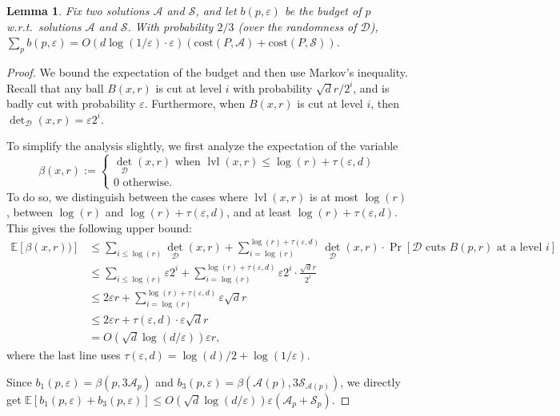 \documentclass[11pt]{article}
\newtheorem{lemma}[theorem]{Lemma}
\newcommand{\eps}{\varepsilon}
\newcommand{\cost}{\mathrm{cost}}
\newcommand{\E}{\mathbb{E}}
\newcommand{\calD}{\mathcal {D}}
\newcommand{\calS}{\mathcal {S}}
\newcommand{\calL}{\mathcal{A}}
\newcommand{\badcut}{\eps}
\newcommand{\offset}{\tau(\eps, d)}
\DeclareMathOperator{\deto}{det}
\DeclareMathOperator{\level}{lvl}
\newcommand{\david}[1]{\textcolor{orange}{#1}}
\begin{document}
\begin{lemma}\label{lem:budgetBoundedKmed}
Fix two solutions $\calL$ and $\calS$, and let $b(p, \eps)$ be the budget of $p$ w.r.t.\ solutions $\calL$ and $\calS$. With probability  $2/3$ (over the randomness of $\calD$),   $\sum_p b(p, \eps) = O(d \log(1/\eps) \cdot \eps) (\cost(P, \calL) + \cost(P, \calS))$.
\end{lemma}
\begin{proof}
 We bound the expectation of the budget and then use Markov's inequality. Recall that any ball $B(x, r)$ is cut at level $i$ with probability $\sqrt{d} r / 2^i$, and is  badly cut with probability $\badcut$. Furthermore, when $B(x, r)$  is cut at level $i$, then $\deto_\calD(x, r) = \eps 2^{i}$. 
 
 To simplify the analysis slightly, we first analyze the expectation of the variable 
\[\beta(x, r) := \begin{cases}\deto_\calD(x, r) \text{ when } \level(x, r) \leq \log(r) + \offset\\
 0 \text{ otherwise.}\end{cases}\]
 To do so, we distinguish between the cases where $\level(x, r)$ is at most $\log(r)$, between $\log(r)$ and $\log(r) + \offset$, and at least $\log(r) + \offset$. This gives the following upper bound:
 \begin{align*}
     \E[\beta(x, r))]
     &\leq \sum_{i \leq \log(r)} \deto_\calD(x, r) + \sum_{i = \log(r)}^{\log(r) + \offset} \deto_\calD(x, r) \cdot \Pr[\calD \text{ cuts } B(p,r) \text{ at a level } i]\\
     &\leq \sum_{i \leq \log(r)} \eps 2^{i} + \sum_{i = \log(r)}^{\log(r) + \offset}\eps 2^{i} \cdot \frac{\sqrt{d} r}{2^i}\\%
     &\leq 2 \eps r + \sum_{i = \log(r)}^{\log(r) + \offset} \eps \sqrt{d} r \\%
     &\leq 2\eps r + \offset \cdot \eps \sqrt{d} r\\%
     &= O(\sqrt{d}\log(d/\eps)) \eps r,
 \end{align*}
 where the last line uses $\offset =\log(d)/2 + \log(1/\badcut)$.


Since $b_1(p, \eps) = \beta(p, 3\calL_p)$ and $b_3(p, \eps) = \beta(\calL(p), 3\calS_{\calL(p)})$, we directly get $\E[b_1(p, \eps) + b_3(p, \eps)] \leq  O(\sqrt{d}\log(d/\eps)) \eps (\calL_p + \calS_p)$. 


\end{proof}
\end{document}
